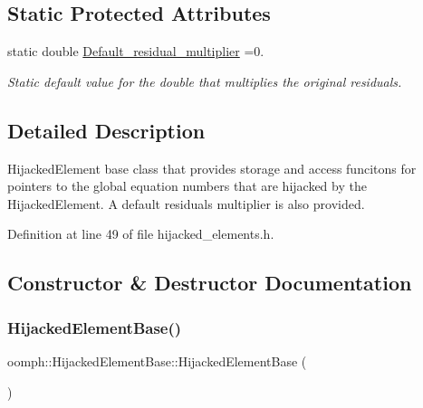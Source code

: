 \subsection*{Static Protected Attributes}
\begin{DoxyCompactItemize}
\item 
static double \hyperlink{classoomph_1_1HijackedElementBase_afd87cc7c33c2b846c5f7a373c352f13a}{Default\+\_\+residual\+\_\+multiplier} =0.
\begin{DoxyCompactList}\small\item\em Static default value for the double that multiplies the original residuals. \end{DoxyCompactList}\end{DoxyCompactItemize}


\subsection{Detailed Description}
Hijacked\+Element base class that provides storage and access funcitons for pointers to the global equation numbers that are hijacked by the Hijacked\+Element. A default residuals multiplier is also provided. 

Definition at line 49 of file hijacked\+\_\+elements.\+h.



\subsection{Constructor \& Destructor Documentation}
\mbox{\label{classoomph_1_1HijackedElementBase_ad062d9c27f6fd3d613a86b32980fa71e}} 
\subsubsection{\texorpdfstring{Hijacked\+Element\+Base()}{HijackedElementBase()}}
{\footnotesize\ttfamily oomph\+::\+Hijacked\+Element\+Base\+::\+Hijacked\+Element\+Base (\begin{DoxyParamCaption}{ }\end{DoxyParamCaption})\hspace{0.3cm}{\ttfamily [inline]}}



